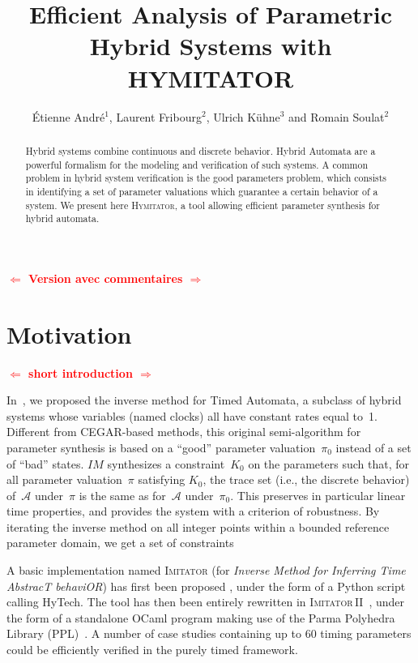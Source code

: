 \documentclass{llncs}
\title{Efficient Analysis of Parametric Hybrid Systems with HYMITATOR}
\author{\'Etienne Andr\'e$^1$, Laurent Fribourg$^2$, Ulrich K\"uhne$^3$ and Romain Soulat$^2$}
\institute{$^1$LIPN, CNRS UMR 7030, Université Paris 13, France \\
$^2$ENS Cachan, CNRS, LSV, UMR8643 \\
$^3$Universit\"at Bremen, Germany}
\newcommand{\A}{\mathcal{A}}
\newcommand{\Ko}{K_0}
\newcommand{\pio}{\pi_0}
\newcommand{\piprime}{\pi}
\newcommand{\IM}{\mathit{IM}}
\newcommand{\hytech}{{\sc HyTech}}
\newcommand{\imitator}{\textsc{Imitator}}
\newcommand{\imitatordeux}{\textsc{Imitator}\,II}
\newcommand{\hymitator}{\textsc{Hymitator}}
\newcommand{\ocaml}{OCaml}
\newcommand{\python}{Python}
\newcommand{\commentaire}[1]{\textcolor{red}{\textbf{$\Leftarrow$  #1 $\Rightarrow$}}}
\begin{document}
\maketitle

\begin{abstract}
	Hybrid systems combine continuous and discrete behavior. 
	Hybrid Automata are a powerful formalism for the modeling and verification of such systems.
	A common problem in hybrid system verification is the good parameters problem, which consists in identifying a set of parameter valuations which guarantee a certain behavior of a system.
	We present here \hymitator{}, a tool allowing efficient parameter synthesis for hybrid automata.
\end{abstract}


\commentaire{Version avec commentaires}


\section{Motivation}

\commentaire{short introduction}

In~\cite{acef09}, we proposed the inverse method for Timed Automata, a subclass of hybrid systems whose variables (named clocks) all have constant rates equal to~1.
Different from CEGAR-based methods, this original semi-algorithm for parameter synthesis is based on a ``good'' parameter valuation~$\pio$ instead of a set of ``bad'' states.
$\IM$ synthesizes a constraint~$\Ko$ on the parameters such that, for all parameter valuation~$\piprime$ satisfying $\Ko$, the trace set (i.e., the discrete behavior) of~$\A$ under~$\piprime$ is the same as for~$\A$ under~$\pio$.
This preserves in particular linear time properties, and provides the system with a criterion of robustness.
By iterating the inverse method on all integer points within a bounded reference parameter domain, we get a set of constraints %

A basic implementation named \imitator{} (for \emph{Inverse Method for Inferring Time AbstracT behaviOR}) has first been proposed%
, under the form of a \python{} script calling \hytech{}.
The tool has then been entirely rewritten in \imitatordeux{}~\cite{and10}, under the form of a standalone \ocaml{} program making use of the Parma Polyhedra Library (PPL)~\cite{bhz08}.
A number of case studies containing up to 60 timing parameters could be efficiently verified in the purely timed framework.
\end{document}
